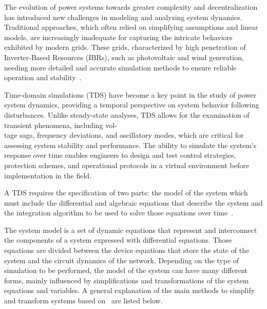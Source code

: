 
The evolution of power systems towards greater complexity and decentralization has introduced new challenges in modeling and analyzing system dynamics. 
Traditional approaches, which often relied on simplifying assumptions and linear models, are increasingly inadequate for capturing the intricate behaviors 
exhibited by modern grids. These grids, characterized by high penetration of Inverter-Based Resources (IBRs), such as photovoltaic and wind generation,
needing more detailed and accurate simulation methods to ensure reliable operation and stability~\cite{LaraTDS}.

Time-domain simulations (TDS) have become a key point in the study of power system dynamics, providing a temporal perspective on system behavior following disturbances.
Unlike steady-state analyses, TDS allows for the examination of transient phenomena, including vol-\\tage sags, frequency deviations, and oscillatory modes, 
which are critical for assessing system stability and performance. The ability to simulate the system's response over time enables engineers to design and test control strategies,
protection schemes, and operational protocols in a virtual environment before implementation in the field.

A TDS requires the specification of two parts: the model of the system which must include the differential and algebraic equations that describe the system and the
integration algorithm to be used to solve those equations over time~\cite{LaraTDS}. 

The system model is a set of dynamic equations that represent and interconnect the components of a system expressed with differential equations. Those
equations are divided between the device equations that store the state of the system and the circuit dynamics of the network. Depending on the type of
simulation to be performed, the model of the system can have many different forms, mainly influenced by simplifications and transformations of the system equations and 
variables. A general explanation of the main methods to simplify and transform systems based on~\cite{LaraTDS} are listed below.

